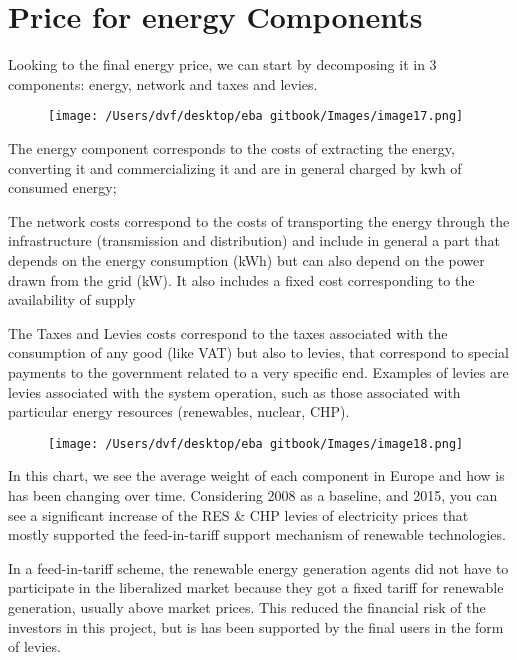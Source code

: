\documentclass[]{book}
\theoremstyle{definition}
\theoremstyle{definition}
\theoremstyle{definition}
\theoremstyle{remark}
\begin{document}
\section{Price for energy Components}\label{price-for-energy-components}

Looking to the final energy price, we can start by decomposing it in 3
components: energy, network and taxes and levies.

\begin{figure}[htbp]
\centering
\texttt{[image: /Users/dvf/desktop/eba gitbook/Images/image17.png]}
\caption{}
\end{figure}

The energy component corresponds to the costs of extracting the energy,
converting it and commercializing it and are in general charged by kwh
of consumed energy;

The network costs correspond to the costs of transporting the energy
through the infrastructure (transmission and distribution) and include
in general a part that depends on the energy consumption (kWh) but can
also depend on the power drawn from the grid (kW). It also includes a
fixed cost corresponding to the availability of supply

The Taxes and Levies costs correspond to the taxes associated with the
consumption of any good (like VAT) but also to levies, that correspond
to special payments to the government related to a very specific end.
Examples of levies are levies associated with the system operation, such
as those associated with particular energy resources (renewables,
nuclear, CHP).

\begin{figure}[htbp]
\centering
\texttt{[image: /Users/dvf/desktop/eba gitbook/Images/image18.png]}
\caption{}
\end{figure}

In this chart, we see the average weight of each component in Europe and
how is has been changing over time. Considering 2008 as a baseline, and
2015, you can see a significant increase of the RES \& CHP levies of
electricity prices that mostly supported the feed-in-tariff support
mechanism of renewable technologies.

In a feed-in-tariff scheme, the renewable energy generation agents did
not have to participate in the liberalized market because they got a
fixed tariff for renewable generation, usually above market prices. This
reduced the financial risk of the investors in this project, but is has
been supported by the final users in the form of levies.
\end{document}
